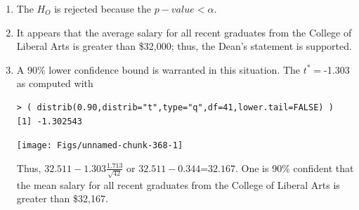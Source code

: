 \documentclass[10pt,openany]{book}\usepackage[]{graphicx}\usepackage[]{color}
\makeatletter
\newenvironment{kframe}{%
 \def\at@end@of@kframe{}%
 \ifinner\ifhmode%
  \def\at@end@of@kframe{\end{minipage}}%
  \begin{minipage}{\columnwidth}%
 \fi\fi%
 \def\FrameCommand##1{\hskip\@totalleftmargin \hskip-\fboxsep
 \colorbox{shadecolor}{##1}\hskip-\fboxsep
     \hskip-\linewidth \hskip-\@totalleftmargin \hskip\columnwidth}%
 \MakeFramed {\advance\hsize-\width
   \@totalleftmargin\z@ \linewidth\hsize
   \@setminipage}}%
 {\par\unskip\endMakeFramed%
 \at@end@of@kframe}
\newenvironment{knitrout}{}{} %
\makeatother
\begin{document}
\begin{itemize}
\begin{enumerate}
\begin{knitrout}
\end{knitrout}
      \item The $H_{O}$ is rejected because the $p-value<\alpha$.
      \item It appears that the average salary for all recent graduates from the College of Liberal Arts is greater than \$32,000; thus, the Dean's statement is supported.
      \item A 90\% lower confidence bound is warranted in this situation.  The $t^{*}=$-1.303 as computed with
\begin{knitrout}
\color{fgcolor}\begin{kframe}
\begin{verbatim}
> ( distrib(0.90,distrib="t",type="q",df=41,lower.tail=FALSE) )
[1] -1.302543
\end{verbatim}
\end{kframe}

{\centering \texttt{[image: Figs/unnamed-chunk-368-1]} 

}



\end{knitrout}
Thus, $32.511-1.303\frac{1.713}{\sqrt{42}}$ or $32.511-0.344$=$32.167$.  One is 90\% confident that the mean salary for all recent graduates from the College of Liberal Arts is greater than \$32,167.
    \end{enumerate}


\end{itemize}
\end{document}

